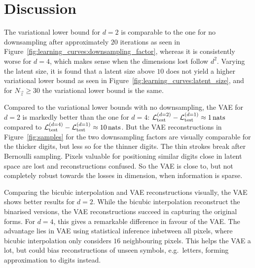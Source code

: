 \section{Discussion}
\label{sec:discussion}

The variational lower bound for $d = 2$ is comparable to the one for no downsampling after approximately $20$ iterations as seen in Figure~\ref{fig:learning_curves:downsampling_factor}, whereas it is consistently worse for $d = 4$, which makes sense when the dimensions lost follow $d^2$.
Varying the latent size, it is found that a latent size above $10$ does not yield a higher variational lower bound as seen in Figure~\ref{fig:learning_curves:latent_size}, and for $N_{\vec{z}} \geq 30$ the variational lower bound is the same.

Compared to the variational lower bounds with no downsampling, the VAE for $d = 2$ is markedly better than the one for $d = 4$: $\mathcal{L}_{\text{test}}^{(d = 2)} - \mathcal{L}_{\text{test}}^{(d = 1)} \approx \SI{1}{nats}$ compared to $\mathcal{L}_{\text{test}}^{(d = 4)} - \mathcal{L}_{\text{test}}^{(d = 1)} \approx \SI{10}{nats}$.
But the VAE reconstructions in Figure~\ref{fig:samples} for the two downsampling factors are visually comparable for the thicker digits, but less so for the thinner digits. The thin strokes break after Bernoulli sampling. Pixels valuable for positioning similar digits close in latent space are lost and reconstructions confused.  
So the VAE is close to, but not completely robust towards the losses in dimension, when information is sparse. 

Comparing the bicubic interpolation and VAE reconstructions visually, the VAE shows better results for $d = 2$.
While the bicubic interpolation reconstruct the binarised versions, the VAE reconstructions succeed in capturing the original forms.
For $d = 4$, this gives a remarkable difference in favour of the VAE.
The advantage lies in VAE using statistical inference inbetween all pixels, where bicubic interpolation only considers $16$ neighbouring pixels. This helps the VAE a lot, but could bias reconstructions of unseen symbols, e.g.\ letters, forming approximation to digits instead.
